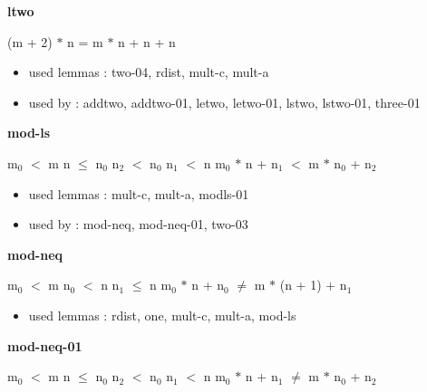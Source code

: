\documentclass[a4paper]{article}
\begin{document}
\bigskip

{\large\bf ltwo}

\medskip

 \Fol (m + 2) $*$ n = m $*$ n + n + n

\begin{itemize}


\item       used lemmas  : two-04, rdist, mult-c, mult-a
\item       used by      : addtwo, addtwo-01, letwo, letwo-01, lstwo, lstwo-01, three-01

\end{itemize}

\medskip

\bigskip

{\large\bf mod-ls}

\medskip

 \Fol $\mbox{m}_{0}$ $<$ m \And n $\le$ $\mbox{n}_{0}$ \And $\mbox{n}_{2}$ $<$ $\mbox{n}_{0}$ \And $\mbox{n}_{1}$ $<$ n \Imp $\mbox{m}_{0}$ $*$ n + $\mbox{n}_{1}$ $<$ m $*$ $\mbox{n}_{0}$ + $\mbox{n}_{2}$

\begin{itemize}


\item       used lemmas  : mult-c, mult-a, modls-01
\item       used by      : mod-neq, mod-neq-01, two-03

\end{itemize}

\medskip

\bigskip

{\large\bf mod-neq}

\medskip

 \Fol $\mbox{m}_{0}$ $<$ m \And $\mbox{n}_{0}$ $<$ n \And $\mbox{n}_{1}$ $\le$ n \Imp $\mbox{m}_{0}$ $*$ n + $\mbox{n}_{0}$ $\neq$ m $*$ (n + 1) + $\mbox{n}_{1}$

\begin{itemize}


\item       used lemmas  : rdist, one, mult-c, mult-a, mod-ls

\end{itemize}

\medskip

\bigskip

{\large\bf mod-neq-01}

\medskip

 \Fol $\mbox{m}_{0}$ $<$ m \And n $\le$ $\mbox{n}_{0}$ \And $\mbox{n}_{2}$ $<$ $\mbox{n}_{0}$ \And $\mbox{n}_{1}$ $<$ n \Imp $\mbox{m}_{0}$ $*$ n + $\mbox{n}_{1}$ $\neq$ m $*$ $\mbox{n}_{0}$ + $\mbox{n}_{2}$
\end{document}
